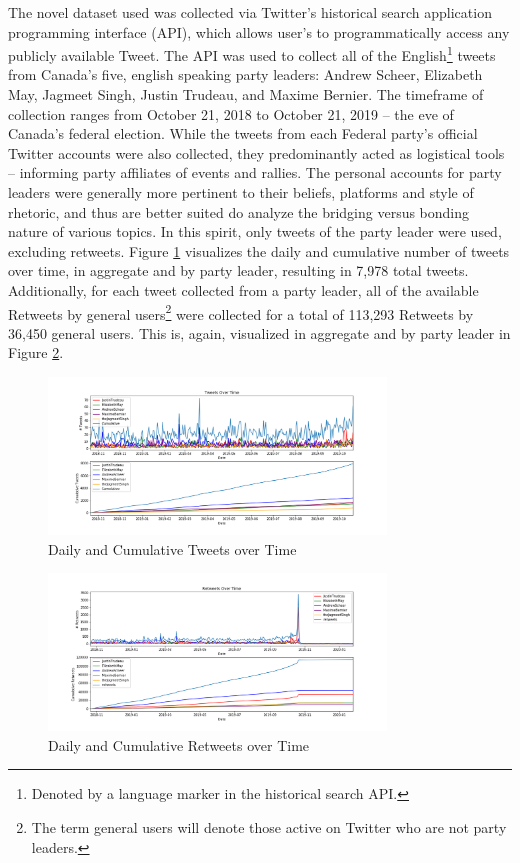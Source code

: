 \documentclass{nws}
\begin{document}
The novel dataset used was collected via Twitter's historical search application
programming interface (API), which allows user's to programmatically access any
publicly available Tweet. The API was used to collect all of the
English\footnote{Denoted by a language marker in the historical search API.}
tweets from Canada's five, english speaking party leaders: Andrew Scheer,
Elizabeth May, Jagmeet Singh, Justin Trudeau, and Maxime Bernier. The timeframe
of collection ranges from October 21, 2018 to October 21, 2019 -- the eve of
Canada’s federal election. While the tweets from each Federal party’s official
Twitter accounts were also collected, they predominantly acted as logistical
tools – informing party affiliates of events and rallies. The personal accounts
for party leaders were generally more pertinent to their beliefs, platforms and
style of rhetoric, and thus are better suited do analyze the bridging versus
bonding nature of various topics. In this spirit, only tweets of the party
leader were used, excluding retweets. Figure \ref{fig:tweets_over_time}
visualizes the daily and cumulative number of tweets over time, in aggregate and
by party leader, resulting in 7,978 total tweets. Additionally, for each tweet collected from a party leader, all of the available
Retweets by general users\footnote{The term general users will denote those
active on Twitter who are not party leaders.} were collected for a total of
113,293 Retweets by 36,450 general users. This is, again, visualized in
aggregate and by party leader in Figure \ref{fig:retweets_over_time}.

\begin{figure}[H]
  \centering
  \includegraphics[width=0.8\textwidth]{figures/tweets_over_time}
  \caption[Daily and Cumulative Tweets over Time]{Daily and Cumulative Tweets over Time}
  \label{fig:tweets_over_time}
\end{figure}

\begin{figure}[H]
  \centering
  \includegraphics[width=0.8\textwidth]{figures/retweets_over_time}
  \caption[Daily and Cumulative Retweets over Time]{Daily and Cumulative Retweets over Time}
  \label{fig:retweets_over_time}
\end{figure}
\end{document}
